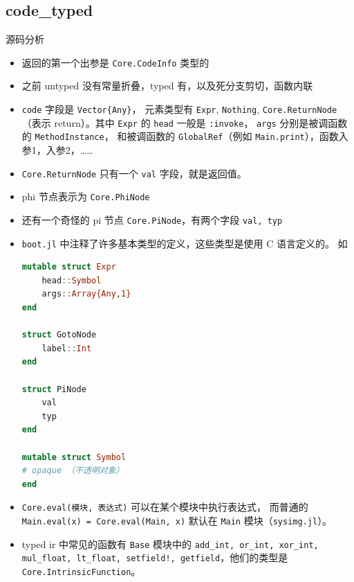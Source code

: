 \subsection{code_typed} 源码分析
\begin{itemize}
\item 返回的第一个出参是 \verb`Core.CodeInfo` 类型的
\item 之前 untyped 没有常量折叠，typed 有，以及死分支剪切，函数内联
\item \verb`code` 字段是 \verb`Vector{Any}`， 元素类型有 \verb`Expr`, \verb`Nothing`, \verb`Core.ReturnNode`（表示 return）。其中 \verb`Expr` 的 \verb`head` 一般是 \verb`:invoke`， \verb`args` 分别是被调函数的 \verb`MethodInstance`， 和被调函数的 \verb`GlobalRef`（例如 \verb`Main.print`），函数入参1，入参2，……
\item \verb`Core.ReturnNode` 只有一个 \verb`val` 字段，就是返回值。
\item phi 节点表示为 \verb`Core.PhiNode`
\item 还有一个奇怪的 pi 节点 \verb`Core.PiNode`，有两个字段 \verb`val, typ`
\item \verb`boot.jl` 中注释了许多基本类型的定义，这些类型是使用 C 语言定义的。 如
\begin{lstlisting}[language=julia]
mutable struct Expr
    head::Symbol
    args::Array{Any,1}
end

struct GotoNode
    label::Int
end

struct PiNode
    val
    typ
end

mutable struct Symbol
# opaque （不透明对象）
end
\end{lstlisting}
\item \verb`Core.eval(模块, 表达式)` 可以在某个模块中执行表达式， 而普通的 \verb`Main.eval(x) = Core.eval(Main, x)` 默认在 \verb`Main` 模块（\verb`sysimg.jl`）。
\item typed ir 中常见的函数有 \verb`Base` 模块中的 \verb`add_int, or_int, xor_int, mul_float, lt_float, setfield!, getfield`，他们的类型是 \verb`Core.IntrinsicFunction`。
\end{itemize}

